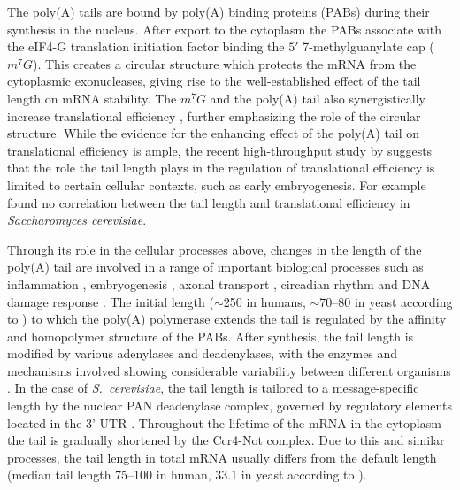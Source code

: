 \documentclass[10pt]{article}
\begin{document}
The poly(A) tails are bound by poly(A) binding proteins (PABs) during their synthesis in the nucleus. After export to the cytoplasm the PABs associate with the eIF4-G translation initiation factor binding the $5'$ 7-methylguanylate cap ($m^7G$). This creates a circular structure which protects the mRNA from the cytoplasmic exonucleases, giving rise to the well-established effect of the tail length on mRNA stability\cite{subtelny14,houseley06}. The $m^7G$ and the poly(A) tail also synergistically increase translational efficiency \cite{gallie91}, further emphasizing the role of the circular structure. While the evidence for the enhancing effect of the poly(A) tail on translational efficiency \cite{preiss98,lackner07} is ample, the recent high-throughput study by \cite{subtelny14} suggests that the role the tail length plays in the regulation of translational efficiency is limited to certain cellular contexts, such as early embryogenesis. For example \cite{subtelny14} found no correlation between the tail length and translational efficiency in \textit{Saccharomyces cerevisiae}.

Through its role in the cellular processes above, changes in the length of the poly(A) tail are involved in a range of important biological processes such as inflammation \cite{weill12}, embryogenesis \cite{weill12,subtelny14}, axonal transport \cite{weill12}, circadian rhythm \cite{gotic12} and DNA damage response \cite{traven05}. The initial length ($\sim$250 in humans, $\sim$70--80 in yeast according to \cite{eckmann11}) to which the poly(A) polymerase extends the tail is regulated by the affinity and homopolymer structure of the PABs. After synthesis, the tail length is modified by various adenylases and deadenylases, with the enzymes and mechanisms involved showing considerable variability between different organisms \cite{brown98,eckmann11}. In the case of \textit{S.~cerevisiae}, the tail length is tailored to a message-specific length by the nuclear PAN deadenylase complex, governed by regulatory elements located in the 3’-UTR \cite{brown98,beilharz07}. Throughout the lifetime of the mRNA in the cytoplasm the tail is gradually shortened by the Ccr4-Not complex. Due to this and similar processes, the tail length in total mRNA usually differs from the default length (median tail length 75--100 in human, 33.1 in yeast according to \cite{subtelny14}).
\end{document}
